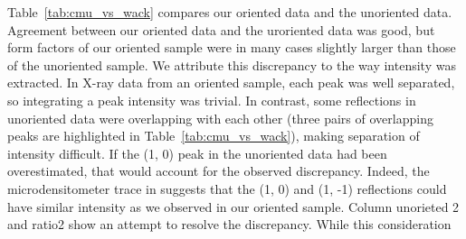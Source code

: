Table~\ref{tab:cmu_vs_wack} compares our oriented data and the unoriented data.
Agreement between our oriented data
and the uroriented data was good, but form factors of our oriented
sample were in many cases slightly larger than those of the unoriented sample.
We attribute this discrepancy to the way intensity was extracted. 
In X-ray data from an oriented sample, each peak
was well separated, so integrating a peak intensity was trivial.
In contrast, some reflections in unoriented data were overlapping with
each other (three pairs of overlapping peaks are highlighted in 
Table~\ref{tab:cmu_vs_wack}), 
making separation of intensity difficult. If the (1, 0) peak in the unoriented 
data had been overestimated, that would account for the observed discrepancy.
Indeed, the microdensitometer trace in \cite{ref:Wack89} suggests that 
the (1, 0) and (1, -1) reflections could have similar intensity as we observed
in our oriented sample. Column unorieted 2 and ratio2 show an attempt
to resolve the discrepancy. While this consideration 

